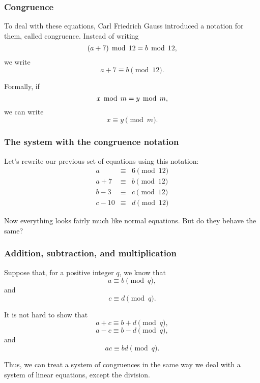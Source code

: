 \begin{frame}\frametitle{Congruence}
  To deal with these equations, Carl Friedrich Gauss introduced a
  notation for them, called congruence.  Instead of writing
  \[ (a+7)\,\bmod\, 12 = b \,\bmod\, 12,\]
  we write
  \[ a+7 \equiv b \pmod {12}.\]
  \pause

  Formally, if
  \[ x\,\bmod\, m = y\,\bmod\, m, \]
  we can write
  \[ x \equiv y \pmod m.\]
\end{frame}

\begin{frame}\frametitle{The system with the congruence notation}
  Let's rewrite our previous set of equations using this notation:
  \begin{eqnarray*}
    a &\equiv& 6 \pmod {12}\\
    a + 7 &\equiv& b \pmod {12} \\
    b - 3 &\equiv& c \pmod {12} \\
    c - 10 &\equiv& d \pmod {12}
  \end{eqnarray*}

  Now everything looks fairly much like normal equations.  But do they
  behave the same?
\end{frame}

\begin{frame}\frametitle{Addition, subtraction, and multiplication}
  Suppose that, for a positive integer $q$, we know that
  \[ a\equiv b \pmod q, \]
  and
  \[ c\equiv d \pmod q.\]

  It is not hard to show that
  \[ a+c\equiv b+d \pmod q, \]
  \[ a-c\equiv b-d \pmod q, \]
  and
  \[ ac\equiv bd \pmod q. \]

  Thus, we can treat a system of congruences in the same way we deal
  with a system of linear equations, except the division.
\end{frame}

